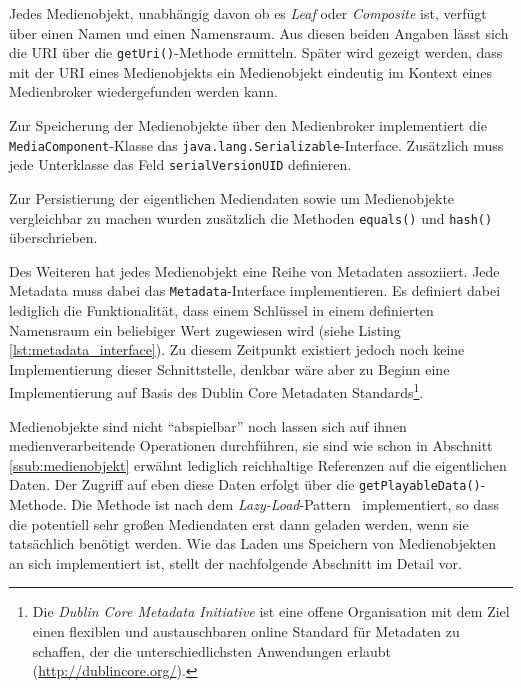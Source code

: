   Jedes Medienobjekt, unabhängig davon ob es \emph{Leaf} oder \emph{Composite} ist, verfügt über einen Namen und einen Namensraum. Aus diesen beiden Angaben lässt sich die URI über die \verb!getUri()!-Methode ermitteln. Später wird gezeigt werden, dass mit der URI eines Medienobjekts ein Medienobjekt eindeutig im Kontext eines Medienbroker wiedergefunden werden kann.
  
  Zur Speicherung der Medienobjekte über den Medienbroker implementiert die \verb!MediaComponent!-Klasse das \verb!java.lang.Serializable!-Interface. Zusätzlich muss jede Unterklasse das Feld \verb!serialVersionUID! definieren.
  
  Zur Persistierung der eigentlichen Mediendaten sowie um Medienobjekte vergleichbar zu machen wurden zusätzlich die Methoden \verb!equals()! und \verb!hash()! überschrieben.
  
  Des Weiteren hat jedes Medienobjekt eine Reihe von Metadaten assoziiert. Jede Metadata muss dabei das \verb!Metadata!-Interface implementieren. Es definiert dabei lediglich die Funktionalität, dass einem Schlüssel in einem definierten Namensraum ein beliebiger Wert zugewiesen wird (siehe Listing \ref{lst:metadata_interface}). Zu diesem Zeitpunkt existiert jedoch noch keine Implementierung dieser Schnittstelle, denkbar wäre aber zu Beginn eine Implementierung auf Basis des Dublin Core Metadaten Standards\footnote{Die \emph{Dublin Core Metadata Initiative} ist eine offene Organisation mit dem Ziel einen flexiblen und austauschbaren online Standard für Metadaten zu schaffen, der die unterschiedlichsten Anwendungen erlaubt (\url{http://dublincore.org/}).}.
  
  
  
  Medienobjekte sind nicht "`abspielbar"' noch lassen sich auf ihnen medienverarbeitende Operationen durchführen, sie sind wie schon in Abschnitt \ref{ssub:medienobjekt} erwähnt lediglich reichhaltige Referenzen auf die eigentlichen Daten. Der Zugriff auf eben diese Daten erfolgt über die \verb!getPlayableData()!-Methode. Die Methode ist nach dem \emph{Lazy-Load}-Pattern~\citep[S. 200]{fowler03peaa} implementiert, so dass die potentiell sehr großen Mediendaten erst dann geladen werden, wenn sie tatsächlich benötigt werden. Wie das Laden uns Speichern von Medienobjekten an sich implementiert ist, stellt der nachfolgende Abschnitt im Detail vor.
 
